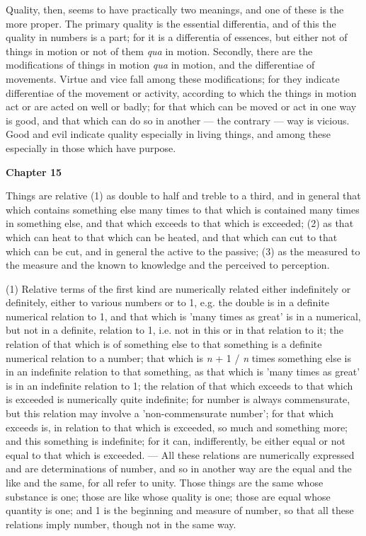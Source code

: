 Quality, then, seems to have practically two meanings, and one of these is the more proper. The primary quality is the essential differentia, and of this the quality in numbers is a part; for it is a differentia of essences, but either not of things in motion or not of them \emph{qua} in motion. Secondly, there are the modifications of things in motion \emph{qua} in motion, and the differentiae of movements. Virtue and vice fall among these modifications; for they indicate differentiae of the movement or activity, according to which the things in motion act or are acted on well or badly; for that which can be moved or act in one way is good, and that which can do so in another — the contrary — way is vicious. Good and evil indicate quality especially in living things, and among these especially in those which have purpose.

\textbf{Chapter 15}

Things are relative (1) as double to half and treble to a third, and in general that which contains something else many times to that which is contained many times in something else, and that which exceeds to that which is exceeded; (2) as that which can heat to that which can be heated, and that which can cut to that which can be cut, and in general the active to the passive; (3) as the measured to the measure and the known to knowledge and the perceived to perception.

(1) Relative terms of the first kind are numerically related either indefinitely or definitely, either to various numbers or to 1, e.g. the double is in a definite numerical relation to 1, and
that which is 'many times as great' is in a numerical, but not in a definite, relation to 1, i.e. not in this or in that relation to it; the relation of that which is of something else to that something is a definite numerical relation to a number; that which is
\emph{n} + 1 / \emph{n}
times something else is in an indefinite relation to that something, as that which is 'many times as great' is in an indefinite relation to 1; the relation of that which exceeds to that which is exceeded is numerically quite indefinite; for number is always commensurate, but this relation may involve a 'non-commensurate number'; for that which exceeds is, in relation to that which is exceeded, so much and something more; and this something is indefinite; for it can, indifferently, be either equal or not equal to that which is exceeded. — All these relations are numerically expressed and are determinations of number, and so in another way are the equal and the like and the same, for all refer to unity. Those things are the same whose substance is one; those are like whose quality is one; those are equal whose quantity is one; and 1 is the beginning and measure of number, so that all these relations imply number, though not in the same way.

